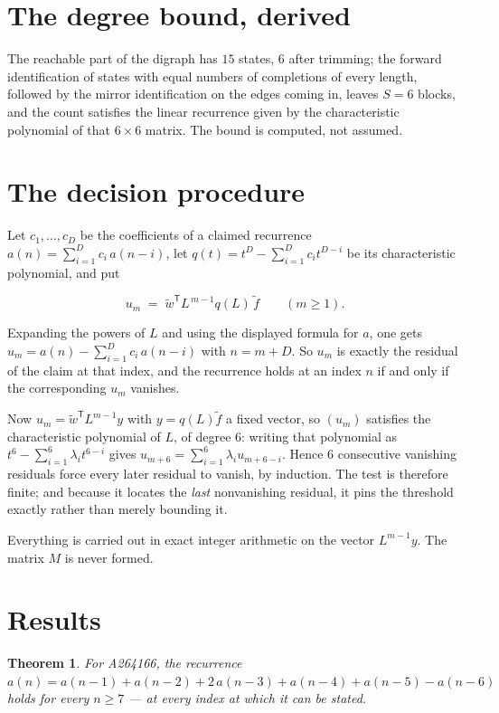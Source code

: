 \documentclass[11pt]{article}
\newtheorem{theorem}{Theorem}
\theoremstyle{definition}
\begin{document}
\section{The degree bound, derived}

The reachable part of the digraph has $15$ states, $6$ after trimming; the forward identification of states with equal numbers of completions of every length, followed by the mirror identification on the edges coming in, leaves $S = 6$ blocks, and the count satisfies the linear recurrence given by the characteristic polynomial of that $6\times6$ matrix. The bound is computed, not assumed.

\section{The decision procedure}

Let $c_1,\dots,c_D$ be the coefficients of a claimed recurrence $a(n) = \sum_{i=1}^{D} c_i\,a(n-i)$, let $q(t) = t^{D} - \sum_{i=1}^{D} c_i t^{D-i}$ be its characteristic polynomial, and put

\[u_m \;=\; \tilde w^{\mathsf T} L^{\,m-1} q(L)\,\tilde f \qquad (m \ge 1).\]

Expanding the powers of $L$ and using the displayed formula for $a$, one gets $u_m = a(n) - \sum_{i=1}^{D} c_i\,a(n-i)$ with $n = m + D$. So $u_m$ is exactly the residual of the claim at that index, and the recurrence holds at an index $n$ if and only if the corresponding $u_m$ vanishes.

Now $u_m = \tilde w^{\mathsf T} L^{m-1} y$ with $y = q(L)\tilde f$ a fixed vector, so $(u_m)$ satisfies the characteristic polynomial of $L$, of degree $6$: writing that polynomial as $t^{6} - \sum_{i=1}^{6} \lambda_i t^{6-i}$ gives $u_{m+6} = \sum_{i=1}^{6} \lambda_i u_{m+6-i}$. Hence $6$ consecutive vanishing residuals force every later residual to vanish, by induction. The test is therefore finite; and because it locates the {\itshape last} nonvanishing residual, it pins the threshold exactly rather than merely bounding it.

Everything is carried out in exact integer arithmetic on the vector $L^{m-1}y$. The matrix $M$ is never formed.

\section{Results}

\begin{theorem} For A264166, the recurrence $a(n) = a(n-1) + a(n-2) + 2\,a(n-3) + a(n-4) + a(n-5) - a(n-6)$ holds for every $n \ge 7$ --- at every index at which it can be stated.\end{theorem}
\end{document}
